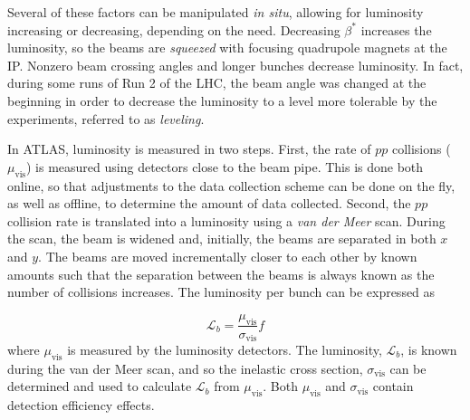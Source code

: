 Several of these factors can be manipulated \emph{in situ}, allowing for luminosity increasing or decreasing, depending on the need. Decreasing $\beta^*$ increases the luminosity, so the beams are \emph{squeezed} with focusing quadrupole magnets at the \ac{IP}. Nonzero beam crossing angles and longer bunches decrease luminosity. In fact, during some runs of Run 2 of the \ac{LHC}, the beam angle was changed at the beginning in order to decrease the luminosity to a level more tolerable by the experiments, referred to as \emph{leveling}. 



In \ac{ATLAS}, luminosity is measured in two steps. First, the rate of $pp$ collisions ($\mu_{\textrm{vis}}$) is measured using detectors close to the beam pipe. This is done both online, so that adjustments to the data collection scheme can be done on the fly, as well as offline, to determine the amount of data collected. Second, the $pp$ collision rate is translated into a luminosity using a \emph{van der Meer} scan. During the scan, the beam is widened and, initially, the beams are separated in both $x$ and $y$. The beams are moved incrementally closer to each other by known amounts such that the separation between the beams is always known as the number of collisions increases. The luminosity per bunch can be expressed as

\begin{equation}
\mathcal{L}_b = \frac{\mu_{\textrm{vis}}}{\sigma_{\textrm{vis}}} f
\end{equation}
where $\mu_{\textrm{vis}}$ is measured by the luminosity detectors. The luminosity, $\mathcal{L}_b$, is known during the van der Meer scan, and so the inelastic cross section, $\sigma_{\textrm{vis}}$ can be determined and used to calculate $\mathcal{L}_b$ from $\mu_{\textrm{vis}}$. Both $\mu_{\textrm{vis}}$ and $\sigma_{\textrm{vis}}$ contain detection efficiency effects. 

